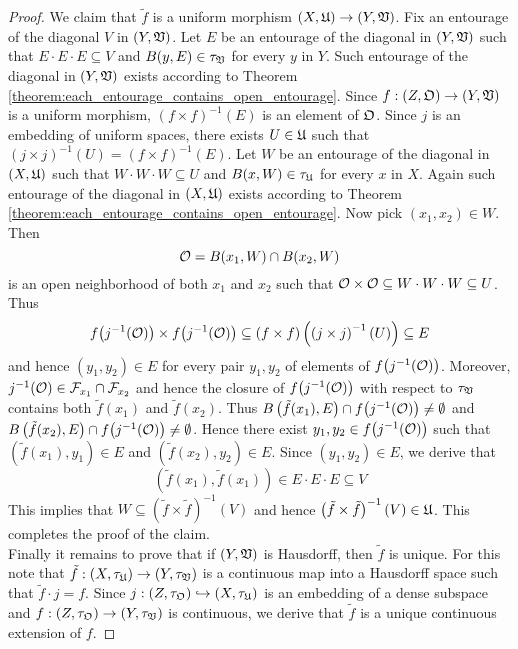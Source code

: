 \begin{proof}
We claim that $\tilde{f}$ is a uniform morphism $\left(X,{\mathfrak U}\right)\rightarrow \left(Y,{\mathfrak V}\right)$. Fix an entourage of the diagonal $V$ in $(Y,{\mathfrak V})$. Let $E$ be an entourage of the diagonal in $(Y,{\mathfrak V})$ such that $E\cdot E\cdot E \subseteq V$ and $B(y,E) \in \tau_{{\mathfrak V}}$ for every $y$ in $Y$. Such entourage of the diagonal in $(Y,{\mathfrak V})$ exists according to Theorem \ref{theorem:each_entourage_contains_open_entourage}. Since $f:\left(Z,{\mathfrak O}\right)\rightarrow \left(Y,{\mathfrak V}\right)$ is a uniform morphism, $\left(f\times f\right)^{-1}(E)$ is an element of ${\mathfrak O}$. Since $j$ is an embedding of uniform spaces, there exists $U \in {\mathfrak U}$ such that $\left(j\times j\right)^{-1}(U) = \left(f\times f\right)^{-1}(E)$. Let $W$ be an entourage of the diagonal in $(X,{\mathfrak U})$ such that $W\cdot W\cdot W \subseteq U$ and $B(x,W) \in \tau_{{\mathfrak U}}$ for every $x$ in $X$. Again such entourage of the diagonal in $(X,{\mathfrak U})$ exists according to Theorem \ref{theorem:each_entourage_contains_open_entourage}. Now pick $(x_1,x_2) \in W$. Then 
$${\mathcal O} = B(x_1,W)\cap B(x_2,W)$$
is an open neighborhood of both $x_1$ and $x_2$ such that ${\mathcal O}\times {\mathcal O} \subseteq W\cdot W \cdot W \subseteq U$. Thus 
$$f\big(j^{-1}({\mathcal O})\big) \times f\big(j^{-1}({\mathcal O})\big) \subseteq \left(f\times f\right)\left(\left(j\times j\right)^{-1}(U)\right) \subseteq E$$
and hence $(y_1,y_2)\in E$ for every pair $y_1,y_2$ of elements of $f\big(j^{-1}({\mathcal O})\big)$. Moreover, $j^{-1}({\mathcal O})\in {\mathcal F}_{x_1}\cap {\mathcal F}_{x_2}$ and hence the closure of $f\big(j^{-1}({\mathcal O})\big)$ with respect to $\tau_{{\mathfrak V}}$ contains both $\tilde{f}(x_1)$ and $\tilde{f}(x_2)$. Thus $B\left(\tilde{f}(x_1),E\right)\cap f\big(j^{-1}({\mathcal O})\big) \neq \emptyset$ and
$B\left(\tilde{f}(x_2),E\right)\cap f\big(j^{-1}({\mathcal O})\big) \neq \emptyset$. Hence there exist $y_1,y_2\in f\big(j^{-1}({\mathcal O})\big)$ such that $\left(\tilde{f}(x_1),y_1\right)\in E$ and $\left(\tilde{f}(x_2),y_2\right)\in E$. Since $(y_1,y_2)\in E$, we derive that
$$\left(\tilde{f}(x_1),\tilde{f}(x_1)\right)\in E\cdot E\cdot E\subseteq V$$
This implies that $W\subseteq \left(\tilde{f}\times \tilde{f}\right)^{-1}(V)$ and hence $\left(\tilde{f}\times \tilde{f}\right)^{-1}(V) \in {\mathfrak U}$. This completes the proof of the claim.\\
Finally it remains to prove that if $\left(Y,{\mathfrak V}\right)$ is Hausdorff, then $\tilde{f}$ is unique. For this note that $\tilde{f}:\left(X,\tau_{{\mathfrak U}}\right)\rightarrow \left(Y,\tau_{{\mathfrak V}}\right)$ is a continuous map into a Hausdorff space such that $\tilde{f}\cdot j = f$. Since $j:\left(Z,\tau_{{\mathfrak O}}\right)\hookrightarrow \left(X,\tau_{{\mathfrak U}}\right)$ is an embedding of a dense subspace and $f:\left(Z,\tau_{{\mathfrak O}}\right)\rightarrow \left(Y,\tau_{{\mathfrak V}}\right)$ is continuous, we derive that $\tilde{f}$ is a unique continuous extension of $f$.
\end{proof}

